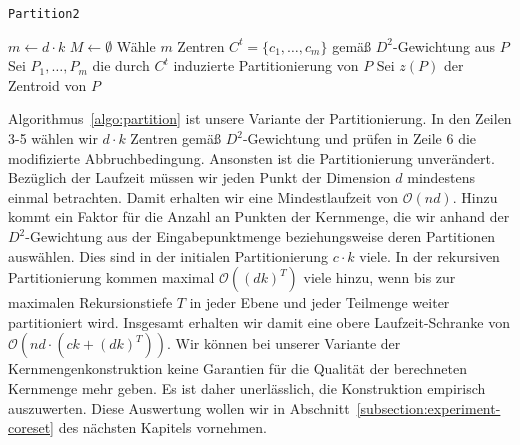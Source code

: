 \begin{algorithm}
\caption{\texttt{Partition2}}
\label{algo:partition}
	\DontPrintSemicolon
	
	\BlankLine
	
	$m \leftarrow d \cdot k$\;
	$M \leftarrow \emptyset$\;
	Wähle $m$ Zentren $C^t = \{c_1, \dots, c_m\}$ gemäß $D^2$-Gewichtung aus $P$\;
	Sei $P_1, \dots, P_m$ die durch $C^t$ induzierte Partitionierung von $P$\;
	Sei $z(P)$ der Zentroid von $P$\;
\end{algorithm}
Algorithmus~\ref{algo:partition} ist unsere Variante der Partitionierung. In den Zeilen 3-5 wählen wir $d \cdot k$ Zentren
gemäß $D^2$-Gewichtung und prüfen in Zeile 6 die modifizierte Abbruchbedingung. Ansonsten ist die Partitionierung unverändert.
\absatz
Bezüglich der Laufzeit müssen wir jeden Punkt der Dimension $d$ mindestens einmal betrachten. Damit erhalten wir eine
Mindestlaufzeit von $\mathcal{O}(nd)$. Hinzu kommt ein Faktor für die Anzahl an Punkten der Kernmenge, die wir anhand der
$D^2$-Gewichtung aus der Eingabepunktmenge beziehungsweise deren Partitionen auswählen. Dies sind in der initialen
Partitionierung $c \cdot k$ viele. In der rekursiven Partitionierung kommen maximal $\mathcal{O}( (dk)^T )$ viele hinzu, wenn
bis zur maximalen Rekursionstiefe $T$ in jeder Ebene und jeder Teilmenge weiter partitioniert wird.
Insgesamt erhalten wir damit eine obere Laufzeit-Schranke von
$\mathcal{O}\left( nd \cdot \left( ck + \left( dk \right)^T \right) \right)$.
\absatz
Wir können bei unserer Variante der Kernmengenkonstruktion keine Garantien für die Qualität der berechneten
Kernmenge mehr geben. Es ist daher unerlässlich, die Konstruktion empirisch auszuwerten. Diese Auswertung wollen wir in
Abschnitt~\ref{subsection:experiment-coreset} des nächsten Kapitels vornehmen.